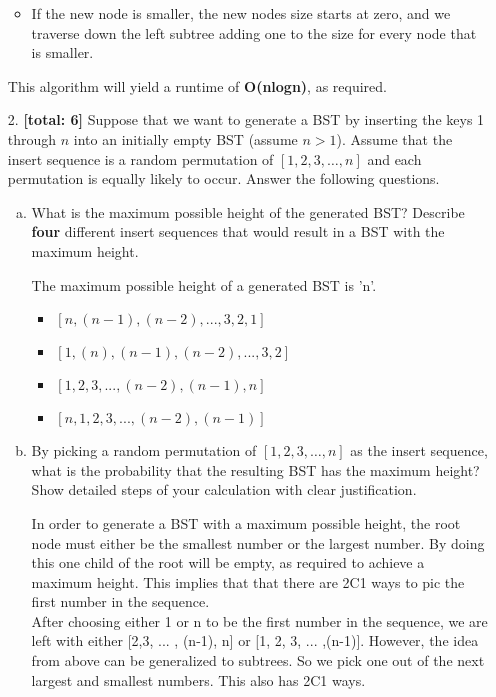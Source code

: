 \documentclass{assignment-263}
\begin{document}
\begin{enumerate}
\begin{itemize}
  \item If the new node is smaller, the new nodes size starts at zero, and we traverse down the left subtree adding one to the size for every node that is smaller. \\
  \end{itemize}
  
  This algorithm will yield a runtime of \textbf{O(nlogn)}, as required.
    
 \clearpage
  \item[2.] \textbf{[total: 6]} Suppose that we want to generate a BST by
  inserting the keys 1 through $n$ into an initially empty BST (assume
  $n > 1$). Assume that the insert sequence is a random permutation of
  $[1,2,3,\dots, n]$ and each permutation is equally likely to
  occur. Answer the following questions.
  \begin{enumerate}[(a)]

  \item What is the maximum possible height of the generated BST?
    Describe \textbf{four} different insert sequences that would
    result in a BST with the maximum height. \vskip10pt
    
    The maximum possible height of a generated BST is 'n'. 
    \begin{itemize}
    \item $[n, (n-1), (n-2), ... , 3, 2, 1]$
    \item $[1, (n), (n-1), (n-2), ... , 3, 2]$
    \item $[1,2,3,...,(n-2),(n-1), n]$
    \item $[n,1,2,3,...,(n-2),(n-1)]$
    \end{itemize} 
    \vskip10pt

  \item By picking a random permutation of $[1,2,3,\dots, n]$ as the
    insert sequence, what is the probability that the resulting BST
    has the maximum height? Show detailed steps of your calculation
    with clear justification. \vskip10pt
    
    In order to generate a BST with a maximum possible height, the root node must either be the smallest number or the largest number. By doing this one child of the root will be empty, as required to achieve a maximum height. This implies that that there are 2C1 ways to pic the first number in the sequence. \\
    
    After choosing either 1 or n to be the first number in the sequence, we are left with either [2,3, ... , (n-1), n] or [1, 2, 3, ... ,(n-1)]. However, the idea from above can be generalized to subtrees. So we pick one out of the next largest and smallest numbers. This also has 2C1 ways. \\
    

\end{enumerate}
\end{enumerate}
\end{document}
